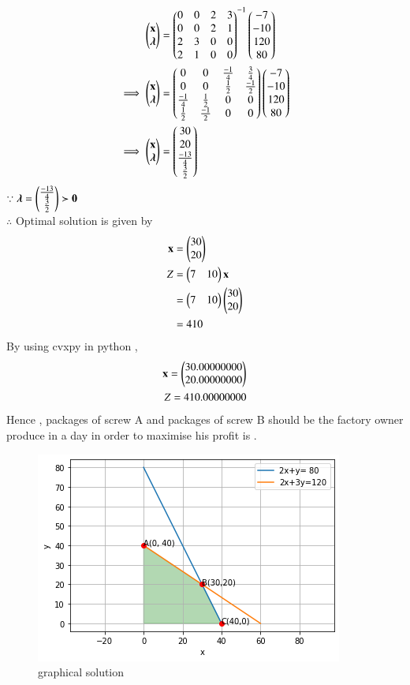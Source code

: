 \documentclass[journal,12pt,twocolumn]{IEEEtran}
\begin{document}
\begin{align}
    \begin{pmatrix}\mathbf{x} \\ \boldsymbol{\lambda}\end{pmatrix} &= \begin{pmatrix}0 & 0 & 2 & 3 \\ 0 & 0 & 2 & 1 \\ 2 & 3 & 0 & 0 \\ 2 & 1 & 0 & 0\end{pmatrix}^{-1}\begin{pmatrix}-7 \\ -10 \\ 120 \\ 80\end{pmatrix}
    \\
    \implies   \begin{pmatrix}\mathbf{x} \\ \boldsymbol{\lambda}\end{pmatrix} &= \begin{pmatrix}0 & 0 & \frac{-1}{4} & \frac{3}{4} \\ 0 & 0 & \frac{1}{2} & \frac{-1}{2} \\ \frac{-1}{4} & \frac{1}{2} & 0 & 0 \\ \frac{1}{2} & \frac{-1}{2} & 0 & 0\end{pmatrix}\begin{pmatrix}-7 \\ -10 \\ 120 \\ 80\end{pmatrix}
    \\
    \implies \begin{pmatrix}\mathbf{x} \\ \boldsymbol{\lambda}\end{pmatrix} &= \begin{pmatrix}30 \\ 20 \\ \frac{-13}{4} \\ \frac{3}{2} \end{pmatrix}
\end{align}
$\because \boldsymbol{\lambda}=\begin{pmatrix}\frac{-13}{4} \\ \frac{3}{2}\end{pmatrix} \succ \mathbf{0} $ 
\\
$\therefore$ Optimal solution is given by
\begin{align}
    \mathbf{x} &= \begin{pmatrix}30\\20\end{pmatrix} \\
    Z &= \begin{pmatrix}7 & 10\end{pmatrix}\mathbf{x} \\
    &= \begin{pmatrix}7 & 10\end{pmatrix}\begin{pmatrix}30 \\ 20\end{pmatrix} \\
    &= 410
\end{align}
By using cvxpy in python ,
\begin{align}
    \mathbf{x}=\begin{pmatrix}30.00000000\\20.00000000\end{pmatrix}\\
    Z = 410.00000000
\end{align}
Hence , packages of screw A and  packages of screw B should be the factory owner produce in a day in order to maximise his  profit is .
\begin{figure}[H]
\centering
\includegraphics[width=\columnwidth]{Figure 11.png}
\caption{graphical solution}
\label{fig: graphical solution}	
\end{figure}
\end{document}
